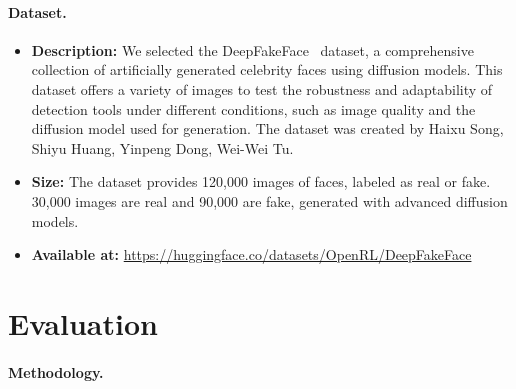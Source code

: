 \documentclass[10pt]{article}
\begin{document}
\paragraph{Dataset.} 
%
\begin{itemize}

\item {\bf Description: } We selected the DeepFakeFace~\cite{song2023robustness} dataset, a comprehensive collection of artificially generated celebrity faces using diffusion models. This dataset offers a variety of images to test the robustness and adaptability of detection tools under different conditions, such as image quality and the diffusion model used for generation. The dataset was created by Haixu Song, Shiyu Huang, Yinpeng Dong, Wei-Wei Tu.  %

\item {\bf Size: } The dataset provides 120,000 images of faces, labeled as real or fake. 30,000 images are real and 90,000 are fake, generated with advanced diffusion models. %

\item {\bf Available at: } \url{https://huggingface.co/datasets/OpenRL/DeepFakeFace} %

\end{itemize}



\section*{Evaluation}

\paragraph{Methodology.} 
\end{document}
